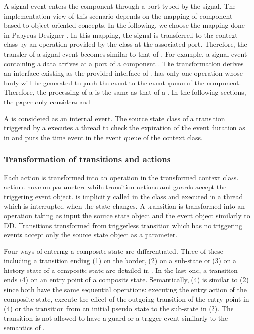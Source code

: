 A signal event enters the component through a port typed by the signal. The implementation view of this scenario depends on the mapping of component-based to object-oriented concepts. In the following, we choose the mapping done in Papyrus Designer \cite{_papyrus/designer/code-generation_????}. In this mapping, the signal is transferred to the context class by an operation provided by the class at the associated port. Therefore, the transfer of a signal event becomes similar to that of . For example, a signal event containing a data  arrives at a port  of a component . The transformation derives an interface  existing as the provided interface of .  has only one operation  whose body will be generated to push the event to the event queue of the component. Therefore, the processing of a  is the same as that of a . In the following sections, the paper only considers  and .

A  is considered as an internal event. The source state class of a transition triggered by a  executes a thread to check the expiration of the event duration as in \cite{Niaz2004} and puts the time event in the event queue of the context class. 

\subsubsection{Transformation of transitions and actions}
\label{subsec:transitions}
Each action is transformed into an operation in the transformed context class.  actions have no parameters while transition actions and guards accept the triggering event object. %
 is implicitly called in the  class and executed in a thread which is interrupted when the state changes. A transition is transformed into an operation taking as input the source state object and the event object similarly to DD. Transitions transformed from triggerless transition which has no triggering events accept only the source state object as a parameter.

Four ways of entering a composite state are differentiated. Three of these including a transition ending (1) on the border, (2) on a sub-state or (3) on a history state of a composite state are detailed in \cite{spinke_object-oriented_2013}. In the last one, a transition  ends (4) on an entry point of a composite state. Semantically, (4) is similar to (2) since both have the same sequential operations: executing the entry action of the composite state, execute the effect of the outgoing transition of the entry point  in (4) or the transition  from an initial pseudo state to the sub-state in (2). The transition  is not allowed to have a guard or a trigger event similarly to the semantics of . 

